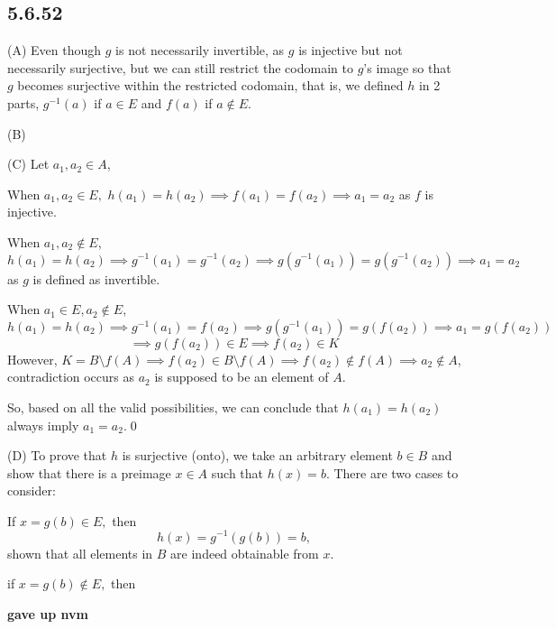 \documentclass{article}
\begin{document}
\subsection*{5.6.52}

(A) Even though $g$ is not necessarily invertible, as $g$ is injective but not necessarily surjective, but we can still restrict the codomain to $g$'s image so that $g$ becomes surjective within the restricted codomain, that is,  we defined $h$ in 2 parts, $g^{-1}(a)$ if $a\in E$ and $f(a)$ if $a\notin E$.

(B) 

(C) Let $a_1,a_2\in A$,

When $a_1,a_2\in E,$ $h(a_1)=h(a_2)\implies f(a_1)=f(a_2)\implies a_1=a_2$ as $f$ is injective. 

When $a_1,a_2 \notin E$, $$h(a_1)=h(a_2)\implies g^{-1}(a_1)=g^{-1}(a_2)\implies g(g^{-1}(a_1))=g(g^{-1}(a_2))\implies a_1=a_2$$ as $g$ is defined as invertible. 

When $a_1\in E, a_2\notin E$, $$h(a_1)=h(a_2)\implies g^{-1}(a_1)=f(a_2)\implies g(g^{-1}(a_1))=g(f(a_2))\implies a_1=g(f(a_2))$$ $$\implies g(f(a_2))\in E\implies f(a_2)\in K$$ However, $K=B\setminus f(A)\implies f(a_2)\in B\setminus f(A)\implies f(a_2)\notin f(A)\implies a_2\notin A$, contradiction occurs as $a_2$ is supposed to be an element of $A$.

So, based on all the valid possibilities, we can conclude that $h(a_1)=h(a_2)$ always imply $a_1=a_2$.\qed

(D) To prove that $h$ is surjective (onto), we take an arbitrary element $b\in B$ and show that there is a preimage $x\in A$ such that $h(x)=b$. There are two cases to consider:

If $x=g(b)\in E,$ then $$h(x)=g^{-1}(g(b))=b,$$ shown that all elements in $B$ are indeed obtainable from $x$.

if $x=g(b)\notin E,$ then 



\textbf{gave up nvm}
\end{document}
